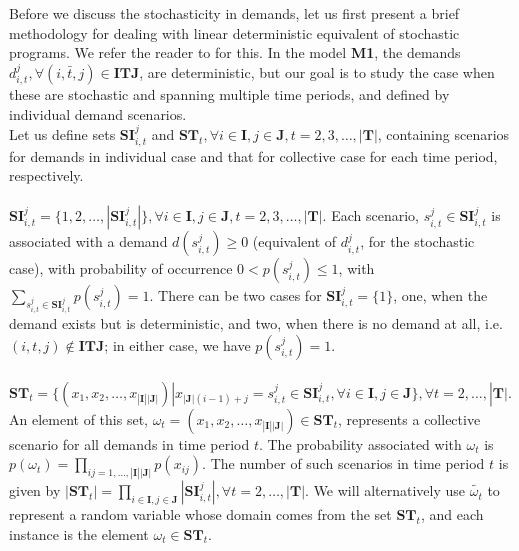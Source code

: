 \documentclass[11pt,letter]{article}
\begin{document}
\noindent
Before we discuss the stochasticity in demands, let us first present a brief methodology for dealing with linear deterministic equivalent of stochastic programs. We refer the reader to \cite{Dantzig1993} for this. In the model \textbf{M1}, the demands $d_{i,t}^{j}, \forall (i,\bar{t},j)\in \textbf{ITJ}$, are deterministic, but our goal is to study the case when these are stochastic and spanning multiple time periods, and defined by individual demand scenarios. \\
Let us define sets $\textbf{SI}_{i,t}^{j}$ and $\textbf{ST}_{t}, \forall i\in \textbf{I}, j\in \textbf{J}, t=2,3,\ldots ,|\textbf{T}|$, containing scenarios for demands in individual case and that for collective case for each time period, respectively. \\
\\
$\textbf{SI}_{i,t}^{j}=\{1,2,\ldots ,|\textbf{SI}_{i,t}^{j}|\}, \forall i\in \textbf{I}, j\in \textbf{J}, t=2,3,\ldots ,|\textbf{T}|$. Each scenario, $s_{i,t}^{j}\in \textbf{SI}_{i,t}^{j}$ is associated with a demand $d(s_{i,t}^{j})\geq 0$ (equivalent of $d_{i,t}^{j}$, for the stochastic case), with probability of occurrence $0<p(s_{i,t}^{j})\leq 1$, with $\sum_{s_{i,t}^{j}\in \textbf{SI}_{i,t}^{j}} p(s_{i,t}^{j})=1$. There can be two cases for $\textbf{SI}_{i,t}^{j}=\{1\}$, one, when the demand exists but is deterministic, and two, when there is no demand at all, i.e. $(i,t,j)\not \in \textbf{ITJ}$; in either case, we have $p(s_{i,t}^{j})=1$. \\
\\
$\textbf{ST}_{t}=\{(x_{1},x_{2},\ldots,x_{|\textbf{I}||\textbf{J}|})|x_{|\textbf{J}|(i-1)+j}=s_{i,t}^{j}\in \textbf{SI}_{i,t}^{j}, \forall i\in \textbf{I},j\in \textbf{J}\}, \forall t=2,\ldots ,|\textbf{T}|$. An element of this set, $\omega_{t}=(x_{1},x_{2},\ldots,x_{|\textbf{I}||\textbf{J}|})\in \textbf{ST}_{t}$, represents a collective scenario for all demands in time period $t$. The probability associated with $\omega_t$ is $p(\omega_t)=\prod_{ij=1,\ldots ,|\textbf{I}||\textbf{J}|} p(x_{ij})$. The number of such scenarios in time period $t$ is given by $|\textbf{ST}_{t}|=\prod_{i\in \textbf{I},j\in \textbf{J}} |\textbf{SI}_{i,t}^{j}|, \forall t=2,\ldots ,|\textbf{T}|$. We will alternatively use $\tilde{\omega_t}$ to represent a random variable whose domain comes from the set $\textbf{ST}_t$, and each instance is the element $\omega_t\in \textbf{ST}_t$.\\
\\
\end{document}
